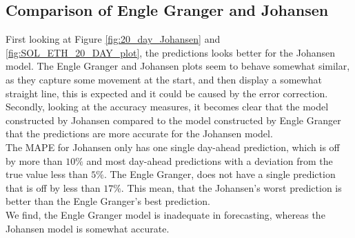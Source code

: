 \subsection{Comparison of Engle Granger and Johansen}
\noindent First looking at Figure \ref{fig:20_day_Johansen} and \ref{fig:SOL_ETH_20_DAY_plot}, the predictions looks better for the Johansen model. The Engle Granger and Johansen plots seem to behave somewhat similar, as they capture some movement at the start, and then display a somewhat straight line, this is expected and it could be caused by the error correction.
Secondly, looking at the accuracy measures, it becomes clear that the model constructed by Johansen compared to the model constructed by Engle Granger that the predictions are more accurate for the Johansen model.\\
The MAPE for Johansen only has one single day-ahead prediction, which is off by more than $10\%$ and most day-ahead predictions with a deviation from the true value less than $5\%$. The Engle Granger, does not have a single prediction that is off by less than $17\%$. This mean, that the Johansen's worst prediction is better than the Engle Granger's best prediction.\\
We find, the Engle Granger model is inadequate in forecasting, whereas the Johansen model is somewhat accurate.